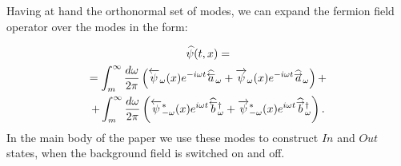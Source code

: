\documentclass[12pt]{article}
\def\psiwR{\overrightarrow{\psi}_{\omega}}
\def\psiwL{\overleftarrow{\psi}_{\omega}}
\def\hataL{\widehat{ \overset{\smash{\raisebox{-0.45ex}{$\scriptstyle\leftarrow$}}}{a} }}
\def\hatbL{\widehat{ \overset{\smash{\raisebox{-0.5ex}{$\scriptstyle\leftarrow$}}}{b} }}
\def\hataR{\widehat{ \overset{\smash{\raisebox{-0.45ex}{$\scriptstyle\rightarrow$}}}{a} }}
\def\hatbR{\widehat{ \overset{\smash{\raisebox{-0.5ex}{$\scriptstyle\rightarrow$}}}{b} }}
\def\w{\omega}
\numberwithin{equation}{section}
\begin{document}
\begin{appendices}
Having at hand the orthonormal set of modes, we can expand the fermion field operator over the modes in the form:

\begin{gather}
\label{operator free dirac}
\widehat{\psi}(t,x) 
=\\=
\nonumber
 \int_{m}^\infty \frac{d \omega}{2\pi}  \left(\psiwL(x) e^{-i\omega t} \hataL_{\w} + \psiwR(x) e^{-i\omega t} \hataR_{\w}\right)
+\\+ \nonumber
\int_m^\infty \frac{d \omega}{2\pi}  \left(\overleftarrow{\psi}^*_{-\omega}(x) e^{i\omega t} \hatbL\phantom{\empty}^{\dagger}_{\w} +\overrightarrow{\psi}^*_{-\omega}(x) e^{i\omega t} \hatbR\phantom{\empty}^{\dagger}_{\w} \right).
\end{gather}
In the main body of the paper we use these modes to construct $In$ and $Out$ states, when the background field is switched on and off.




\end{appendices}
\end{document}

